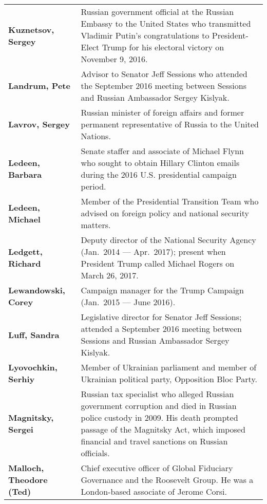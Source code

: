 \begin{longtable}{ p{} p{} }
    \textbf{Kuznetsov, Sergey} & Russian government official at the Russian Embassy to the United States who transmitted Vladimir Putin’s congratulations to President-Elect Trump for his electoral victory on November 9, 2016. \\

    \textbf{Landrum, Pete} & Advisor to Senator Jeff Sessions who attended the September 2016 meeting between Sessions and Russian Ambassador Sergey Kislyak. \\

    \textbf{Lavrov, Sergey} & Russian minister of foreign affairs and former permanent representative of Russia to the United Nations. \\

    \textbf{Ledeen, Barbara} & Senate staffer and associate of Michael Flynn who sought to obtain Hillary Clinton emails during the 2016 U.S. presidential campaign period. \\

    \textbf{Ledeen, Michael} & Member of the Presidential Transition Team who advised on foreign policy and national security matters. \\

    \textbf{Ledgett, Richard} & Deputy director of the National Security Agency (Jan.~2014 — Apr.~2017); present when President Trump called Michael Rogers on March 26, 2017. \\

    \textbf{Lewandowski, Corey} & Campaign manager for the Trump Campaign (Jan.~2015 — June 2016). \\

    \textbf{Luff, Sandra} & Legislative director for Senator Jeff Sessions; attended a September 2016 meeting between Sessions and Russian Ambassador Sergey Kislyak. \\

    \textbf{Lyovochkin, Serhiy} & Member of Ukrainian parliament and member of Ukrainian political party, Opposition Bloc Party. \\

    \textbf{Magnitsky, Sergei} & Russian tax specialist who alleged Russian government corruption and died in Russian police custody in 2009. His death prompted passage of the Magnitsky Act, which imposed financial and travel sanctions on Russian officials. \\

    \textbf{Malloch, Theodore (Ted)} & Chief executive officer of Global Fiduciary Governance and the Roosevelt Group. He was a London-based associate of Jerome Corsi. \\


\end{longtable}
